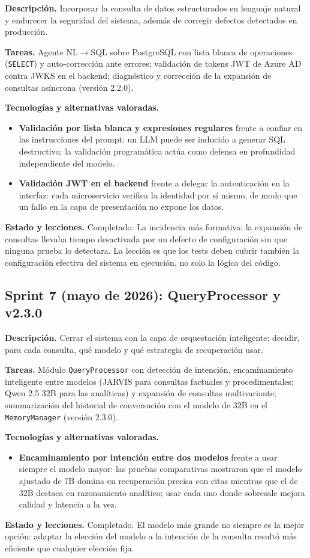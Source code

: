 \textbf{Descripción.} Incorporar la consulta de datos estructurados en lenguaje natural y endurecer la seguridad del sistema, además de corregir defectos detectados en producción.

\textbf{Tareas.} Agente NL$\rightarrow$SQL sobre PostgreSQL con lista blanca de operaciones (\texttt{SELECT}) y auto-corrección ante errores; validación de tokens JWT de Azure AD contra JWKS en el backend; diagnóstico y corrección de la expansión de consultas asíncrona (versión 2.2.0).

\textbf{Tecnologías y alternativas valoradas.}
\begin{itemize}
    \item \textbf{Validación por lista blanca y expresiones regulares} frente a confiar en las instrucciones del prompt: un LLM puede ser inducido a generar SQL destructivo; la validación programática actúa como defensa en profundidad independiente del modelo.
    \item \textbf{Validación JWT en el backend} frente a delegar la autenticación en la interfaz: cada microservicio verifica la identidad por sí mismo, de modo que un fallo en la capa de presentación no expone los datos.
\end{itemize}

\textbf{Estado y lecciones.} Completado. La incidencia más formativa: la expansión de consultas llevaba tiempo desactivada por un defecto de configuración sin que ninguna prueba lo detectara. La lección es que los tests deben cubrir también la configuración efectiva del sistema en ejecución, no solo la lógica del código.

\subsection{Sprint 7 (mayo de 2026): QueryProcessor y v2.3.0}

\textbf{Descripción.} Cerrar el sistema con la capa de orquestación inteligente: decidir, para cada consulta, qué modelo y qué estrategia de recuperación usar.

\textbf{Tareas.} Módulo \texttt{QueryProcessor} con detección de intención, encaminamiento inteligente entre modelos (JARVIS para consultas factuales y procedimentales; Qwen 2.5 32B para las analíticas) y expansión de consultas multivariante; summarización del historial de conversación con el modelo de 32B en el \texttt{MemoryManager} (versión 2.3.0).

\textbf{Tecnologías y alternativas valoradas.}
\begin{itemize}
    \item \textbf{Encaminamiento por intención entre dos modelos} frente a usar siempre el modelo mayor: las pruebas comparativas mostraron que el modelo ajustado de 7B domina en recuperación precisa con citas mientras que el de 32B destaca en razonamiento analítico; usar cada uno donde sobresale mejora calidad y latencia a la vez.
\end{itemize}

\textbf{Estado y lecciones.} Completado. El modelo más grande no siempre es la mejor opción: adaptar la elección del modelo a la intención de la consulta resultó más eficiente que cualquier elección fija.
